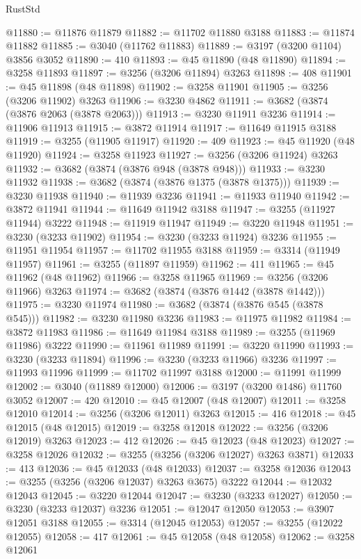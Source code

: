 \begin{lexlean}{RustStd}
\begin{coremodule}
{\begin{coremodule}
{{{{{{{{{{{{{{{{{{{{{{{{{{{{{{{{{{{{{@11880 := @11876 @11879
@11882 := @11702 @11880 @3188
@11883 := @11874 @11882
@11885 := @3040 (@11762 @11883)
@11889 := @3197 (@3200 @1104) @3856 @3052
@11890 := 410
@11893 := @45 @11890 (@48 @11890)
@11894 := @3258 @11893
@11897 := @3256 (@3206 @11894) @3263
@11898 := 408
@11901 := @45 @11898 (@48 @11898)
@11902 := @3258 @11901
@11905 := @3256 (@3206 @11902) @3263
@11906 := @3230 @4862
@11911 := @3682 (@3874 (@3876 @2063 (@3878 @2063)))
@11913 := @3230 @11911 @3236
@11914 := @11906 @11913
@11915 := @3872 @11914
@11917 := @11649 @11915 @3188
@11919 := @3255 (@11905 @11917)
@11920 := 409
@11923 := @45 @11920 (@48 @11920)
@11924 := @3258 @11923
@11927 := @3256 (@3206 @11924) @3263
@11932 := @3682 (@3874 (@3876 @948 (@3878 @948)))
@11933 := @3230 @11932
@11938 := @3682 (@3874 (@3876 @1375 (@3878 @1375)))
@11939 := @3230 @11938
@11940 := @11939 @3236
@11941 := @11933 @11940
@11942 := @3872 @11941
@11944 := @11649 @11942 @3188
@11947 := @3255 (@11927 @11944) @3222
@11948 := @11919 @11947
@11949 := @3220 @11948
@11951 := @3230 (@3233 @11902)
@11954 := @3230 (@3233 @11924) @3236
@11955 := @11951 @11954
@11957 := @11702 @11955 @3188
@11959 := @3314 (@11949 @11957)
@11961 := @3255 (@11897 @11959)
@11962 := 411
@11965 := @45 @11962 (@48 @11962)
@11966 := @3258 @11965
@11969 := @3256 (@3206 @11966) @3263
@11974 := @3682 (@3874 (@3876 @1442 (@3878 @1442)))
@11975 := @3230 @11974
@11980 := @3682 (@3874 (@3876 @545 (@3878 @545)))
@11982 := @3230 @11980 @3236
@11983 := @11975 @11982
@11984 := @3872 @11983
@11986 := @11649 @11984 @3188
@11989 := @3255 (@11969 @11986) @3222
@11990 := @11961 @11989
@11991 := @3220 @11990
@11993 := @3230 (@3233 @11894)
@11996 := @3230 (@3233 @11966) @3236
@11997 := @11993 @11996
@11999 := @11702 @11997 @3188
@12000 := @11991 @11999
@12002 := @3040 (@11889 @12000)
@12006 := @3197 (@3200 @1486) @11760 @3052
@12007 := 420
@12010 := @45 @12007 (@48 @12007)
@12011 := @3258 @12010
@12014 := @3256 (@3206 @12011) @3263
@12015 := 416
@12018 := @45 @12015 (@48 @12015)
@12019 := @3258 @12018
@12022 := @3256 (@3206 @12019) @3263
@12023 := 412
@12026 := @45 @12023 (@48 @12023)
@12027 := @3258 @12026
@12032 := @3255 (@3256 (@3206 @12027) @3263 @3871)
@12033 := 413
@12036 := @45 @12033 (@48 @12033)
@12037 := @3258 @12036
@12043 := @3255 (@3256 (@3206 @12037) @3263 @3675) @3222
@12044 := @12032 @12043
@12045 := @3220 @12044
@12047 := @3230 (@3233 @12027)
@12050 := @3230 (@3233 @12037) @3236
@12051 := @12047 @12050
@12053 := @3907 @12051 @3188
@12055 := @3314 (@12045 @12053)
@12057 := @3255 (@12022 @12055)
@12058 := 417
@12061 := @45 @12058 (@48 @12058)
@12062 := @3258 @12061
}}}}}}}}}}}}}}}}}}}}}}}}}}}}}}}}}}}}}
\end{coremodule}}
\end{coremodule}
\end{lexlean}
